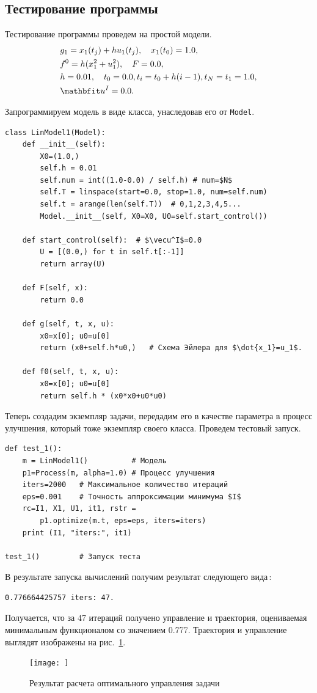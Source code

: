 \documentclass[a4paper,14pt, openany, twoside, draft]{extbook} %
\begin{document}
\subsection{Тестирование программы}
\label{sec:testing}

Тестирование программы проведем на простой модели.
\begin{align*}
  &g_1=x_1(t_j)+hu_1(t_j),\quad x_1(t_0)=1.0,\\
  &f^0=h(x_1^2+u_1^2),\quad F=0.0, \\
  &h=0.01,\quad t_0=0.0, t_i=t_0+h(i-1), t_N=t_1=1.0,\\
  &\vecu^I=0.0.
\end{align*}

Запрограммируем модель в виде класса, унаследовав его от \texttt{Model}.
\begin{verbatim}
class LinModel1(Model):
    def __init__(self):
        X0=(1.0,)
        self.h = 0.01
        self.num = int((1.0-0.0) / self.h) # num=$N$
        self.T = linspace(start=0.0, stop=1.0, num=self.num)
        self.t = arange(len(self.T))  # 0,1,2,3,4,5...
        Model.__init__(self, X0=X0, U0=self.start_control())

    def start_control(self):  # $\vecu^I$=0.0
        U = [(0.0,) for t in self.t[:-1]]
        return array(U)

    def F(self, x):
        return 0.0

    def g(self, t, x, u):
        x0=x[0]; u0=u[0]
        return (x0+self.h*u0,)   # Схема Эйлера для $\dot{x_1}=u_1$.

    def f0(self, t, x, u):
        x0=x[0]; u0=u[0]
        return self.h * (x0*x0+u0*u0)
\end{verbatim}

Теперь создадим экземпляр задачи, передадим его в качестве параметра в процесс улучшения, который тоже экземпляр своего класса.  Проведем тестовый запуск.

\begin{verbatim}
def test_1():
    m = LinModel1()          # Модель
    p1=Process(m, alpha=1.0) # Процесс улучшения
    iters=2000   # Максимальное количество итераций
    eps=0.001    # Точность аппроксимации минимума $I$
    rc=I1, X1, U1, it1, rstr =
        p1.optimize(m.t, eps=eps, iters=iters)
    print (I1, "iters:", it1)

test_1()         # Запуск теста
\end{verbatim}

В результате запуска вычислений получим результат следующего вида\,:
\begin{verbatim}
0.776664425757 iters: 47.
\end{verbatim}
Получается, что за 47 итераций получено управление и траектория, оцениваемая минимальным функционалом со значением 0.777.  Траектория и управление выглядят изображены на рис.~\ref{fig:result}.
\begin{figure}[hb]
  \centering
  \texttt{[image: ]}
  \caption{Результат расчета оптимального управления задачи}
  \label{fig:result}
\end{figure}
\end{document}
